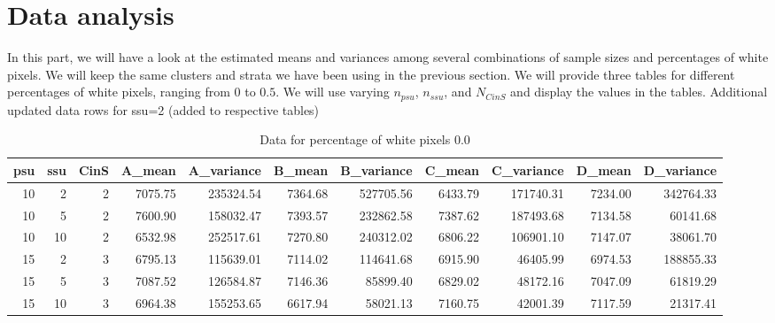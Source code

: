 \documentclass{article}
\begin{document}
\section{Data analysis}
In this part, we will have a look at the estimated means and variances among several combinations of sample sizes and percentages of white pixels. We will keep the same clusters and strata we have been using in the previous section. 
We will provide three tables for different percentages of white pixels, ranging from $0$ to $0.5$. We will use varying $n_{psu}$,  $n_{ssu}$, and $N_{CinS}$ and display the values in the tables.
Additional updated data rows for ssu=2 (added to respective tables)
\begin{table}[htbp]
\centering
\begin{tabular}{rrrrrrrrrrr}
\hline
psu & ssu & CinS & A\_mean & A\_variance & B\_mean & B\_variance & C\_mean & C\_variance & D\_mean & D\_variance \\
\hline
10 & 2 & 2 & 7075.75 & 235324.54 & 7364.68 & 527705.56 & 6433.79 & 171740.31 & 7234.00 & 342764.33 \\
10 & 5 & 2 & 7600.90 & 158032.47 & 7393.57 & 232862.58 & 7387.62 & 187493.68 & 7134.58 & 60141.68 \\
10 & 10 & 2 & 6532.98 & 252517.61 & 7270.80 & 240312.02 & 6806.22 & 106901.10 & 7147.07 & 38061.70 \\
15 & 2 & 3 & 6795.13 & 115639.01 & 7114.02 & 114641.68 & 6915.90 & 46405.99 & 6974.53 & 188855.33 \\
15 & 5 & 3 & 7087.52 & 126584.87 & 7146.36 & 85899.40 & 6829.02 & 48172.16 & 7047.09 & 61819.29 \\
15 & 10 & 3 & 6964.38 & 155253.65 & 6617.94 & 58021.13 & 7160.75 & 42001.39 & 7117.59 & 21317.41 \\
\hline
\end{tabular}
\caption{Data for percentage of white pixels 0.0}
\label{tab:white_0}
\end{table}
\end{document}
